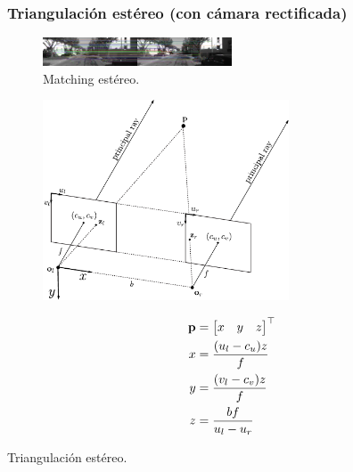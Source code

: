 \begin{frame}
    \frametitle{Triangulación estéreo (con cámara rectificada)}
    \footnotesize
    \begin{figure}
        \includegraphics[width=0.5\textwidth]{./images/stereo_matches.pdf}
        \caption{Matching estéreo.}    
    \end{figure}
    \vspace{-2em}
    \begin{minipage}[t]{0.65\textwidth}
        \begin{figure}
            \includegraphics[width=0.65\textwidth]{./images/stereo_triangulation.pdf}
        \end{figure}
    \end{minipage}
    \begin{minipage}[t]{0.3\textwidth}
        \centering
        \begin{align*}
            \boldsymbol{\mathbf{p}}&=\begin{bmatrix}x & y & z\end{bmatrix}^{\top}\\
            x &= \frac{(u_{l}-c_{u})z}{f}\\
            y &= \frac{(v_{l}-c_{v})z}{f}\\
            z &= \frac{bf}{u_{l}-u_{r}}
        \end{align*}
    \end{minipage}
    \centering
    
    Triangulación estéreo.
\end{frame}

